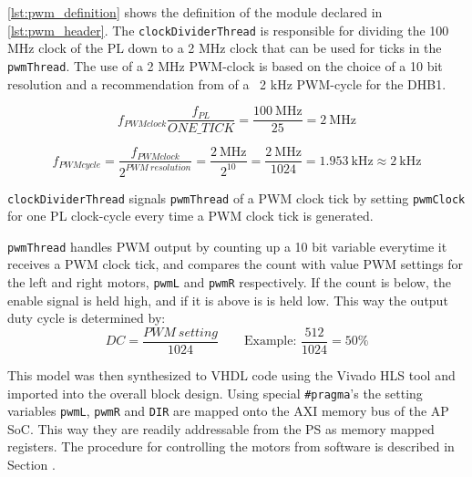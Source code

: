 \documentclass[Main]{subfiles}
\begin{document}
			

			\autoref{lst:pwm_definition} shows the definition of the module declared in \autoref{lst:pwm_header}.
			The \texttt{clockDividerThread} is responsible for dividing the 100 MHz clock of the PL down to a 2 MHz clock that can be used for ticks in the \texttt{pwmThread}.
			The use of a 2 MHz PWM-clock is based on the choice of a 10 bit resolution and a recommendation from \cite{Digilent2013} of a ~2 kHz PWM-cycle for the DHB1.

			\begin{equation}
				f_{PWMclock}
				\frac{f_{PL}}{ONE\_TICK} =
				\frac{100\ \text{MHz}}{25} =
				2\ \text{MHz}
			\end{equation}

			\begin{equation}
				f_{PWMcycle} =
				\frac{f_{PWMclock}}{2^{PWM\ resolution}} =
				\frac{2\ \text{MHz}}{2^{10}} =
				\frac{2\ \text{MHz}}{1024} =
				1.953\ \text{kHz}
				\approx 2\ \text{kHz}
			\end{equation}

			\texttt{clockDividerThread} signals \texttt{pwmThread} of a PWM clock tick by setting \texttt{pwmClock} for one PL clock-cycle every time a PWM clock tick is generated.

			\texttt{pwmThread} handles PWM output by counting up a 10 bit variable everytime it receives a PWM clock tick, and compares the count with value PWM settings for the left and right motors, \texttt{pwmL} and \texttt{pwmR} respectively.
			If the count is below, the enable signal is held high, and if it is above is is held low.
			This way the output duty cycle is determined by:
			\begin{equation}
				DC = \frac{PWM\ setting}{1024}
				\quad \quad \text{Example: }
				\frac{512}{1024} = 50\%
			\end{equation}

			\newpage
			

			This model was then synthesized to VHDL code using the Vivado HLS tool and imported into the overall block design.
			Using special \texttt{\#pragma}'s the setting variables \texttt{pwmL}, \texttt{pwmR} and \texttt{DIR} are mapped onto the AXI memory bus of the AP SoC.
			This way they are readily addressable from the PS as memory mapped registers.
			The procedure for controlling the motors from software is described in Section .
\end{document}
